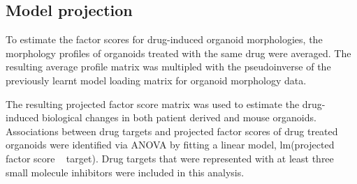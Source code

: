 \begin{flushleft}
\subsection{Model projection}
To estimate the factor scores for drug-induced organoid morphologies, the morphology profiles of organoids treated with the same drug were averaged. The resulting average profile matrix was multipled with the pseudoinverse of the previously learnt model loading matrix for organoid morphology data. 

\smallbreak
The resulting projected factor score matrix was used to estimate the drug-induced biological changes in both patient derived and mouse organoids. Associations between drug targets and projected factor scores of drug treated organoids were identified via ANOVA by fitting a linear model, lm(projected factor score ~ target). Drug targets that were represented with at least three small molecule inhibitors were included in this analysis.

\end{flushleft}
